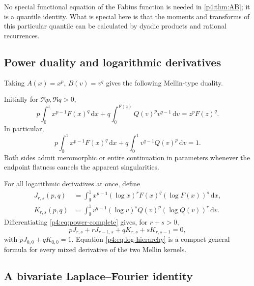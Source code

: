 \documentclass[11pt,oneside]{article}
\theoremstyle{definition}
\theoremstyle{remark}
\newcommand{\F}{F}
\newcommand{\Q}{Q}
\newcommand{\dd}{\,\mathrm d}
\newcommand{\1}{\mathbf 1}
\begin{document}
\begin{remark}
No special functional equation of the Fabius function is needed in
\cref{p4:thm:AB}; it is a quantile identity.  What is special here is that the moments and
transforms of this particular quantile can be calculated by dyadic products and rational
recurrences.
\end{remark}

\subsection{Power duality and logarithmic derivatives}

Taking \(A(x)=x^p\), \(B(v)=v^q\) gives the following Mellin-type duality.

\begin{corollary}\label{p4:cor:power-duality}
Initially for \(\Re p,\Re q>0\),
\begin{equation}\label{p4:eq:power-incomplete}
 p\int_0^z x^{p-1}\F(x)^q\dd x
 +q\int_0^{\F(z)}\Q(v)^p v^{q-1}\dd v
 =z^p\F(z)^q.
\end{equation}
In particular,
\begin{equation}\label{p4:eq:power-complete}
 p\int_0^1x^{p-1}\F(x)^q\dd x
 +q\int_0^1v^{q-1}\Q(v)^p\dd v=1.
\end{equation}
Both sides admit meromorphic or entire continuation in parameters whenever the endpoint
flatness cancels the apparent singularities.
\end{corollary}

For all logarithmic derivatives at once, define
\begin{align}
 J_{r,s}(p,q)&=\int_0^1x^{p-1}(\log x)^r\F(x)^q(\log\F(x))^s\dd x,\label{p4:eq:Jrs}\\
 K_{r,s}(p,q)&=\int_0^1v^{q-1}(\log v)^s\Q(v)^p(\log\Q(v))^r\dd v.\label{p4:eq:Krs}
\end{align}
Differentiating \cref{p4:eq:power-complete} gives, for \(r+s>0\),
\begin{equation}\label{p4:eq:log-hierarchy}
 pJ_{r,s}+rJ_{r-1,s}+qK_{r,s}+sK_{r,s-1}=0,
\end{equation}
with \(pJ_{0,0}+qK_{0,0}=1\).  Equation \cref{p4:eq:log-hierarchy} is a compact
general formula for every mixed derivative of the two Mellin kernels.

\subsection{A bivariate Laplace--Fourier identity}
\end{document}
